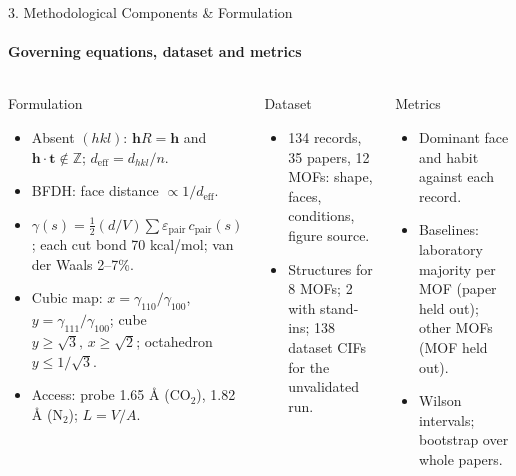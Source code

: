\documentclass[aspectratio=169, 11pt]{beamer}
\begin{document}
\begin{frame}{3. Methodological Components \& Formulation}
    \framesubtitle{Governing equations, dataset and metrics}
    \begin{columns}[T]
        \begin{block}{Formulation}
            \scriptsize
            \begin{itemize}
                \item Absent $(hkl)$: $\mathbf{h}R=\mathbf{h}$ and $\mathbf{h}\cdot\mathbf{t}\notin\mathbb{Z}$; $d_\text{eff}=d_{hkl}/n$.
                \item BFDH: face distance $\propto 1/d_\text{eff}$.
                \item $\gamma(s)=\tfrac12 (d/V)\sum \varepsilon_\text{pair}\,c_\text{pair}(s)$; each cut bond 70 kcal/mol; van der Waals 2--7\%.
                \item Cubic map: $x=\gamma_{110}/\gamma_{100}$, $y=\gamma_{111}/\gamma_{100}$; cube $y\ge\sqrt3,\,x\ge\sqrt2$; octahedron $y\le1/\sqrt3$.
                \item Access: probe 1.65 \AA{} (CO$_2$), 1.82 \AA{} (N$_2$); $L=V/A$.
            \end{itemize}
        \end{block}
        \begin{block}{Dataset}
            \scriptsize
            \begin{itemize}
                \item 134 records, 35 papers, 12 MOFs: shape, faces, conditions, figure source.
                \item Structures for 8 MOFs; 2 with stand-ins; 138 dataset CIFs for the unvalidated run.
            \end{itemize}
        \end{block}
        \begin{block}{Metrics}
            \scriptsize
            \begin{itemize}
                \item Dominant face and habit against each record.
                \item Baselines: laboratory majority per MOF (paper held out); other MOFs (MOF held out).
                \item Wilson intervals; bootstrap over whole papers.
            \end{itemize}
        \end{block}
    \end{columns}
\end{frame}
\end{document}
